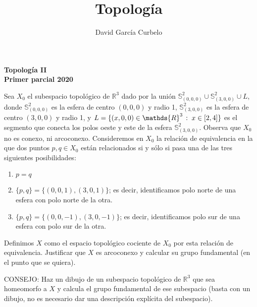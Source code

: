 \documentclass[fleqn]{article}
\author{David García Curbelo}
\title{Topología}
\def\R{\mathds{R}}
\def\S{\mathds{S}}
\begin{document}
    \doublespace

    \setcounter{page}{1}
    \pagestyle{plain}

    \begin{center}
        {\large\bf{Topología II}} \\
        \bf{Primer parcial 2020}\\
        
    \end{center}

    Sea $X_0$ el subespacio topológico de $\R^3$ dado por la unión $\S^2_{(0,0,0)} \cup \S^2_{(3,0,0)} \cup L$, donde $\S^2_{(0,0,0)}$ es la esfera 
    de centro $(0,0,0)$ y radio 1, $\S^2_{(3,0,0)}$ es la esfera de centro $(3,0,0)$ y radio 1, y 
    $L = \{(x,0,0) \in \R^3 \thinspace : \thickspace x \in [2,4]\}$ es el segmento que conecta los polos oeste y este de la esfera $\S^2_{(3,0,0)}$.
    Observa que $X_0$ no es conexo, ni arcoconexo. Consideremos en $X_0$ la relación de equivalencia en la que dos puntos $p,q \in X_0$ están relacionados
    si y sólo si pasa una de las tres siguientes posibilidades:
    \begin{enumerate}
        \item $p = q$
        \item $\{p,q\} = \{(0,0,1), (3,0,1)\}$; es decir, identificamos polo norte de una esfera con polo norte de la otra.
        \item $\{p,q\} = \{(0,0,-1), (3,0,-1)\}$; es decir, identificamos polo sur de una esfera con polo sur de la otra.
    \end{enumerate}

    Definimos $X$ como el espacio topológico cociente de $X_0$ por esta relación de equivalencia. Justificar que $X$ es arcoconexo y calcular su grupo 
    fundamental (en el punto que se quiera).

    \noindent
    CONSEJO: Haz un dibujo de un subespacio topológico de $\R^3$ que sea homeomorfo a $X$ y calcula el grupo fundamental de ese subespacio (basta con un 
    dibujo, no es necesario dar una descripción explícita del subespacio). 

    \newpage
\end{document}

